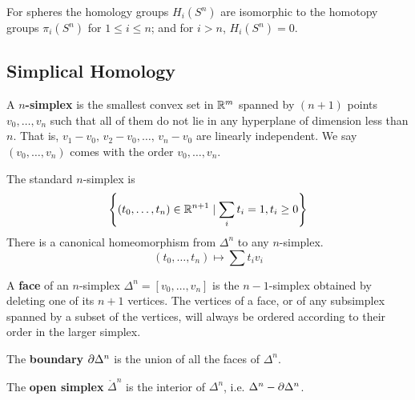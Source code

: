 \documentclass[12pt]{amsart}
\begin{document}
\begin{remark}
    For spheres the homology groups $H_i(S^n)$ are isomorphic to the homotopy groups $\pi_i(S^n)$ for $1 \leq i \leq n$; and for $i > n$, $H_i(S^n) = 0$. 
\end{remark}

\subsection{Simplical Homology}

\begin{definition}
    A \textbf{$n$-simplex} is the smallest convex set in $\mathbb R^m$ spanned by $(n+1)$ points $v_0, \ldots, v_n$ such that all of them do not lie in any hyperplane of dimension less than $n$. That is, $v_1 - v_0, \, v_2 - v_0, \ldots, \, v_n - v_0$ are linearly independent. We say $(v_0, \ldots, v_n)$ comes with the order $v_0, \ldots, v_n$.

    The standard $n$-simplex is 
    \[\left\{(t_0, \ldots, t_n) \in \mathbb R^{n+1} \mid \sum_{i} t_i = 1, t_i \geq 0\right\}\]
    There is a canonical homeomorphism from $\Delta^n$ to any $n$-simplex. 
    \[(t_0, \ldots, t_n) \mapsto \sum t_iv_i\]
\end{definition}

\begin{definition}
    A \textbf{face} of an $n$-simplex $\Delta^n = [v_0, \ldots, v_n]$ is the $n-1$-simplex obtained by deleting one of its $n+1$ vertices. The vertices of a face, or of any subsimplex spanned by a subset of the vertices, will always be ordered according to their order in the larger simplex.
\end{definition}

\begin{definition}
    The \textbf{boundary} $\partial{\Delta}^n$ is the union of all the faces of $\Delta^n$.
\end{definition}

\begin{definition}
    The \textbf{open simplex} $\mathring{\Delta}^n$ is the interior of $\Delta^n$, i.e. $\Delta^n - \partial \Delta^n$. 
\end{definition}
\end{document}
